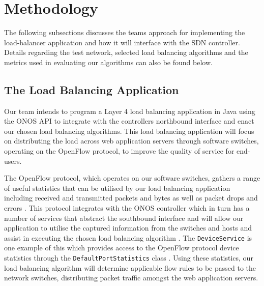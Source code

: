 \section{Methodology} \label{sec:method}
The following subsections discusses the teams approach for implementing the load-balancer application and how it will interface with the SDN controller. Details regarding the test network, selected load balancing algorithms and the metrics used in evaluating our algorithms can also be found below.
 
\subsection{The Load Balancing Application}
Our team intends to program a Layer 4 load balancing application in Java using the ONOS API to integrate with the controllers northbound interface and enact our chosen load balancing algorithms. This load balancing application will focus on distributing the load across web application servers through software switches, operating on the OpenFlow protocol, to improve the quality of service for end-users.

The OpenFlow protocol, which operates on our software switches, gathers a range of useful statistics that can be utilised by our load balancing application including received and transmitted packets and bytes as well as packet drops and errors \cite{OSS}. This protocol integrates with the ONOS controller which in turn  has a number of services that abstract the southbound interface and will allow our application to utilise the captured information from the switches and hosts and assist in executing the chosen load balancing algorithm \cite{onosAPI}. The \lstinline{DeviceService} is one example of this which provides access to the OpenFlow protocol device statistics through the \lstinline{DefaultPortStatistics} class \cite{onosAPI}. Using these statistics, our load balancing algorithm will determine applicable flow rules to be passed to the network switches, distributing packet traffic amongst the web application servers.  

